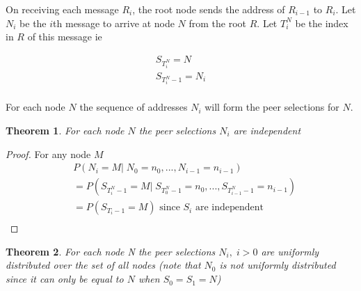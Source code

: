 \documentclass[a4paper,10pt]{article}
\newtheorem*{thm}{Theorem}
\begin{document}
On receiving each message $R_i$, the root node sends the address of $R_{i-1}$ to $R_i$. Let $N_i$ be the $i$th message to arrive at node $N$ from the root $R$. Let $T^N_i$ be the index in $R$ of this message ie

\begin{gather*}
S_{T^N_i} = N \\
S_{T^N_i-1} = N_i \\
\end{gather*}

For each node $N$ the sequence of addresses $N_i$ will form the peer selections for $N$.

\begin{thm}For each node $N$ the peer selections $N_i$ are independent\end{thm}

\begin{proof}
For any node $M$
\begin{align*}
& \!\!\! P(N_i = M |\; N_0=n_0, ... ,N_{i-1} = n_{i-1}) \\
& = P(S_{T^N_i-1} = M |\; S_{T^N_0-1} = n_0, ... ,S_{T^N_{i-1}-1} = n_{i-1}) \\
& = P(S_{T_i-1} = M) \text{ since $S_i$ are independent} \\
\end{align*}
\end{proof}

\begin{thm}For each node N the peer selections $N_i, \; i>0$ are uniformly distributed over the set of all nodes (note that $N_0$ is not uniformly distributed since it can only be equal to $N$ when $S_0 = S_1 = N$)\end{thm}
\end{document}
